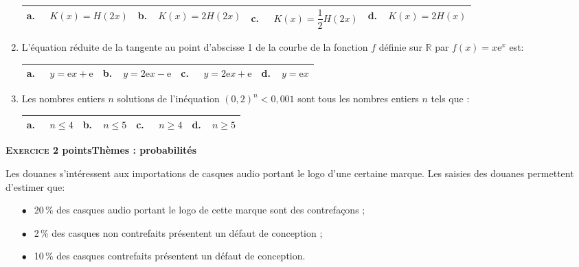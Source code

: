 \documentclass[11pt]{article}
\newcommand{\R}{\mathbb{R}}
\begin{document}
\begin{enumerate}
\begin{center}
\begin{tabularx}{\linewidth}{|*{4}{X|}}\hline
\textbf{a.~~} $K(x) =H(2x)$&\textbf{b.~~}$K(x) =2H(2x)$&\textbf{c.~~} $ K(x) =\dfrac{1}{2}H(2x)$&\textbf{d.~~}$K(x) =2H(x)$\rule[-3mm]{0mm}{9mm}\\ \hline
\end{tabularx}
\end{center}

\item L'équation réduite de la tangente au point d'abscisse 1 de la courbe de la fonction $f$ définie sur $\R$ par $f(x) = x\text{e}^x$ est:

\begin{center}
\begin{tabularx}{\linewidth}{|*{4}{X|}}\hline
\textbf{a.~~} $y = \text{e}x + \text{e}$&\textbf{b.~~}$y =2\text{e}x - \text{e}$&\textbf{c.~~} $y = 2\text{e}x +  \text{e}$&\textbf{d.~~}$y = \text{e}x$\\ \hline
\end{tabularx}
\end{center}

\item Les nombres entiers $n$ solutions de l'inéquation $(0,2)^n < 0,001$ sont tous les
nombres entiers $n$ tels que :

\begin{center}
\begin{tabularx}{\linewidth}{|*{4}{X|}}\hline
\textbf{a.~~} $n \leqslant 4$&\textbf{b.~~}$n\leqslant 5$&\textbf{c.~~} $n \geqslant 4$ &\textbf{d.~~}$n \geqslant 5$\\ \hline
\end{tabularx}
\end{center}

\end{enumerate}

\bigskip

\textbf{\textsc{Exercice 2}  points\hfill Thèmes : probabilités}

\medskip

Les douanes s'intéressent aux importations de casques audio portant le logo d'une certaine marque. Les saisies des douanes permettent d'estimer que:

\setlength\parindent{10mm}
\begin{itemize}
\item[$\bullet~~$] 20\,\% des casques audio portant le logo de cette marque sont des contrefaçons ;
\item[$\bullet~~$] 2\,\% des casques non contrefaits présentent un défaut de conception ;\item[$\bullet~~$] 10\,\% des casques contrefaits présentent un défaut de conception.
\end{itemize}
\setlength\parindent{0mm}
\end{document}
